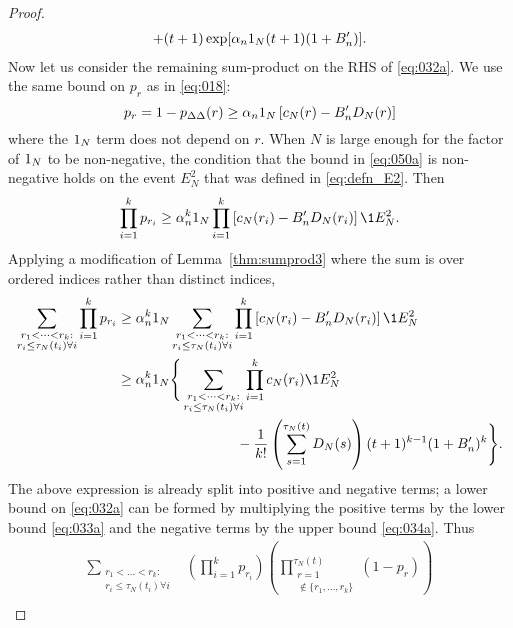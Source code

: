 \begin{proof}
\begin{align}
        + (t+1) \exp[ \alpha_n 1_N (t+1) (1+B_n^\prime) ] .
        \label{eq:034a}
\end{align}
Now let us consider the remaining sum-product on the RHS of \eqref{eq:032a}.
We use the same bound on $p_r$ as in \eqref{eq:018}:
\begin{equation}\label{eq:050a}
p_r
= 1 -p_{\Delta\Delta}(r) 
\geq \alpha_n 1_N 
        \left[ c_N(r) - B_n^\prime D_N(r) \right] 
\end{equation}
where the $1_N$ term does not depend on $r$.
When $N$ is large enough for the factor of $1_N$ to be non-negative, the condition that the bound in \eqref{eq:050a} is non-negative holds on the event $E_N^2$ that was defined in \eqref{eq:defn_E2}.
Then
\begin{equation*}
\prod_{i=1}^k p_{r_i}
\geq \alpha_n^k \ON 
        \prod_{i=1}^k \left[ c_N(r_i) - B_n^\prime D_N(r_i) \right] \1{E_N^2} .
\end{equation*}
Applying a modification of Lemma~\ref{thm:sumprod3} where the sum is over ordered indices rather than distinct indices,
\begin{align*}
\sum_{\substack{r_1 <\dots< r_k :\\ r_i \leq \tau_N(t_i) \forall i}}
        \prod_{i=1}^k p_{r_i}
&\geq \alpha_n^k \ON \sum_{\substack{r_1 <\dots< r_k 
        :\\ r_i \leq \tau_N(t_i) \forall i}} \prod_{i=1}^k
        \left[ c_N(r_i) - B_n^\prime D_N(r_i) \right] \1{E_N^2} \\
&\geq \alpha_n^k \ON \Bigg\{
        \sum_{\substack{r_1 <\dots< r_k :\\ r_i \leq \tau_N(t_i) \forall i}}
        \prod_{i=1}^k c_N(r_i) \1{E_N^2} \\
    &\hspace{3cm}- \frac{1}{k!} \left( \sum_{s=1}^{\tau_N(t)} D_N(s) \right)
        (t+1)^{k-1} (1+B_n^\prime)^k \Bigg\} .
\end{align*}
The above expression is already split into positive and negative terms; a lower bound on \eqref{eq:032a} can be formed by multiplying the positive terms by the lower bound \eqref{eq:033a} and the negative terms by the upper bound \eqref{eq:034a}. 
Thus
\begin{align*}
\sum_{\substack{r_1 <\dots< r_k :\\ r_i \leq \tau_N(t_i) \forall i}}
        &\left( \prod_{i=1}^k p_{r_i} \right)
        \left( \prod_{\substack{r=1 \\ \notin \{r_1,\dots,r_k\} }}^{\tau_N(t)} 
        (1-p_r) \right) \\

\end{align*}
\end{proof}
